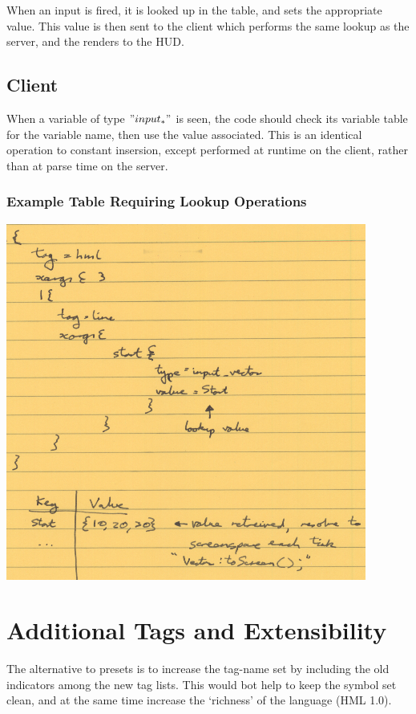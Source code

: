 \documentclass[10pt,a4paper]{article}
\begin{document}
When an input is fired, it is looked up in the table, and sets the appropriate value.  This value is then sent to the client which performs the same lookup as the server, and the renders to the HUD.

\subsection{Client}

When a variable of type $"input_*"$ is seen, the code should check its variable table for the variable name, then use the value associated.  This is an identical operation to constant insersion, except performed at runtime on the client, rather than at parse time on the server.

\subsubsection{Example Table Requiring Lookup Operations}

\includegraphics[scale=0.75]{images/parse_table_with_input_and_lookup_table.png}

\section{Additional Tags and Extensibility}

The alternative to presets is to increase the tag-name set by including the old indicators among the new tag lists.  This would bot help to keep the symbol set clean, and at the same time increase the `richness' of the language (HML 1.0).
\end{document}
